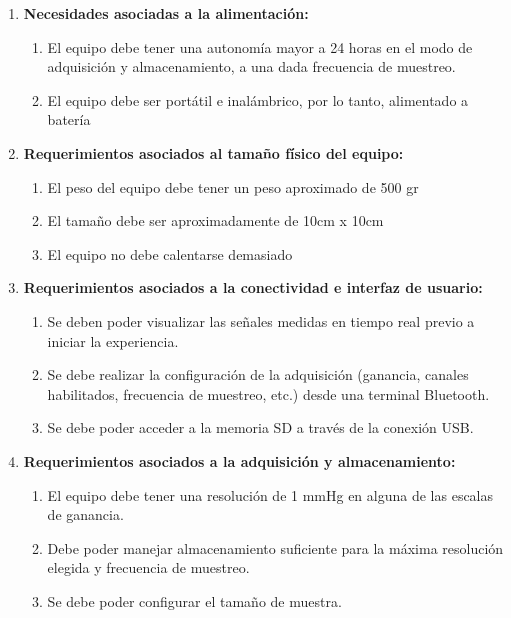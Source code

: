 \begin{enumerate}
	\item \textbf{Necesidades asociadas a la alimentación:} 
	\begin{enumerate}
		\item El equipo debe tener una autonomía mayor a 24 horas en el modo de adquisición y almacenamiento, a una dada frecuencia de muestreo.
		\item El equipo debe ser portátil e inalámbrico, por lo tanto, alimentado a batería
	\end{enumerate}
	
	\item \textbf{Requerimientos asociados al tamaño físico del equipo:}
	\begin{enumerate}
		\item El peso del equipo debe tener un peso aproximado de 500 gr
		\item El tamaño debe ser aproximadamente de 10cm x 10cm
		\item El equipo no debe calentarse demasiado
	\end{enumerate}
	
	\item \textbf{Requerimientos asociados a la conectividad e interfaz de usuario:}
	
	\begin{enumerate}
		\item Se deben poder visualizar las señales medidas en tiempo real previo a iniciar la experiencia.
		\item Se debe realizar la configuración de la adquisición (ganancia, canales habilitados, frecuencia de muestreo, etc.) desde una terminal Bluetooth.
		\item Se debe poder acceder a la memoria SD a través de la conexión USB.
	\end{enumerate}


	\item \textbf{Requerimientos asociados a la adquisición y almacenamiento:}
	
	\begin{enumerate}
		\item El equipo debe tener una resolución de 1 mmHg en alguna de las escalas de ganancia.
		\item Debe poder manejar almacenamiento suficiente para la máxima resolución elegida y frecuencia de muestreo.
		\item Se debe poder configurar el tamaño de muestra.
	\end{enumerate}

\end{enumerate}


